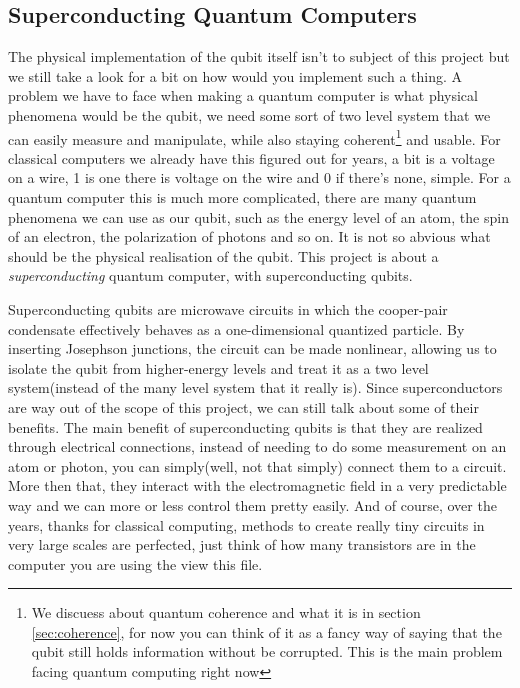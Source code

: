 \documentclass[english, a4paper, 12pt, twoside]{article}
\numberwithin{equation}{section} %
\begin{document}
\subsection{Superconducting Quantum Computers}  %
The physical implementation of the qubit itself isn't to subject of this project but we still take a look for a bit on how would you implement such a thing. A problem we have to face when making a quantum computer is what physical phenomena would be the qubit, we need some sort of two level system that we can easily measure and manipulate, while also staying coherent\footnote{We discuess about quantum coherence and what it is in section \ref{sec:coherence}, for now you can think of it as a fancy way of saying that the qubit still holds information without be corrupted. This is the main problem facing quantum computing right now} and usable. For classical computers we already have this figured out for years, a bit is a voltage on a wire, 1 is one there is voltage on the wire and 0 if there's none, simple. For a quantum computer this is much more complicated, there are many quantum phenomena we can use as our qubit, such as the energy level of an atom, the spin of an electron, the polarization of photons and so on. It is not so abvious what should be the physical realisation of the qubit. This project is about a \textit{superconducting} quantum computer, with superconducting  qubits.

Superconducting qubits are microwave circuits in which the cooper-pair condensate effectively behaves as a one-dimensional quantized particle. By inserting Josephson junctions, the circuit can be made nonlinear, allowing us to isolate the qubit from higher-energy levels and treat it as a two  level system(instead of the many level system that it really is).
Since superconductors are way out of the scope of this project, we can still talk about some of their benefits. The main benefit of superconducting qubits is that they are realized through electrical connections, instead of needing to do some measurement on an atom or photon, you can simply(well, not that simply) connect them to a circuit. More then that, they interact with the electromagnetic field in a very predictable way and we can more or less control them pretty easily. And of course, over the years, thanks for classical computing, methods to create really tiny circuits in very large scales are perfected, just think of how many transistors are in the computer you are using the view this file.
\end{document}
